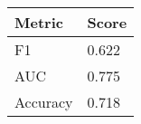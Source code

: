 \begin{tabular}{ll}
\toprule
  Metric &              Score \\
\midrule
      F1 &           0.622 \\
     AUC &           0.775 \\
Accuracy & 0.718 \\
\bottomrule
\end{tabular}
